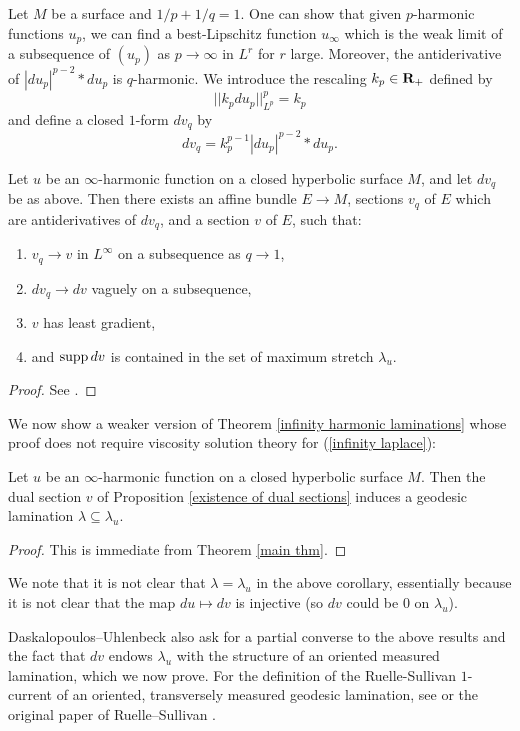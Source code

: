 Let $M$ be a surface and $1/p + 1/q = 1$.
One can show that given $p$-harmonic functions $u_p$, we can find a best-Lipschitz function $u_\infty$ which is the weak limit of a subsequence of $(u_p)$ as $p \to \infty$ in $L^r$ for $r$ large.
Moreover, the antiderivative of $|du_p|^{p - 2} * du_p$ is $q$-harmonic.
We introduce the rescaling $k_p \in \mathbf{R}_+$ defined by 
$$||k_p du_p||_{L^p}^p = k_p$$
and define a closed $1$-form $dv_q$ by
$$dv_q = k_p^{p - 1} |du_p|^{p - 2} * du_p.$$

\begin{proposition}\label{existence of dual sections}
Let $u$ be an $\infty$-harmonic function on a closed hyperbolic surface $M$, and let $dv_q$ be as above. Then there exists an affine bundle $E \to M$, sections $v_q$ of $E$ which are antiderivatives of $dv_q$, and a section $v$ of $E$, such that:
\begin{enumerate}
\item $v_q \to v$ in $L^\infty$ on a subsequence as $q \to 1$,
\item $dv_q \to dv$ vaguely on a subsequence,
\item $v$ has least gradient,
\item and $\operatorname{supp} dv$ is contained in the set of maximum stretch $\lambda_u$.
\end{enumerate}
\end{proposition}
\begin{proof}
See \cite[\S6]{daskalopoulos2020transverse}.
\end{proof}

We now show a weaker version of Theorem \ref{infinity harmonic laminations} whose proof does not require viscosity solution theory for (\ref{infinity laplace}):

\begin{corollary}
Let $u$ be an $\infty$-harmonic function on a closed hyperbolic surface $M$.
Then the dual section $v$ of Proposition \ref{existence of dual sections} induces a geodesic lamination $\lambda \subseteq \lambda_u$.
\end{corollary}
\begin{proof}
This is immediate from Theorem \ref{main thm}.
\end{proof}

We note that it is not clear that $\lambda = \lambda_u$ in the above corollary, essentially because it is not clear that the map $du \mapsto dv$ is injective (so $dv$ could be $0$ on $\lambda_u$).

Daskalopoulos--Uhlenbeck also ask for a partial converse to the above results and the fact that $dv$ endows $\lambda_u$ with the structure of an oriented measured lamination, which we now prove. For the definition of the Ruelle-Sullivan $1$-current of an oriented, transversely measured geodesic lamination, see \cite[\S8]{daskalopoulos2020transverse} or the original paper of Ruelle--Sullivan \cite{Ruelle75}.


